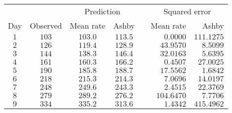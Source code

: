 \begin{tabular}{cccccrr}                                                   \toprule
    &          & \multicolumn{2}{c}{Prediction}  && \multicolumn{2}{c}{Squared error} \\
  \cmidrule{3-4}  \cmidrule{6-7}
Day & Observed & Mean rate & Ashby   && Mean rate  & Ashby      \\\midrule
$1$ & $103$    & $103.0$   & $113.5$ && $0.0000$   & $111.1275$ \\[4pt]
$2$ & $126$    & $119.4$   & $128.9$ && $43.9570$  & $8.5099$   \\[4pt]
$3$ & $144$    & $138.3$   & $146.4$ && $32.0163$  & $5.6395$   \\[4pt]
$4$ & $161$    & $160.3$   & $166.2$ && $0.4507$   & $27.0025$  \\[4pt]
$5$ & $190$    & $185.8$   & $188.7$ && $17.5562$  & $1.6842$   \\[4pt]
$6$ & $218$    & $215.3$   & $214.3$ && $7.0696$   & $14.0197$  \\[4pt]
$7$ & $248$    & $249.6$   & $243.3$ && $2.4515$   & $22.3769$  \\[4pt]
$8$ & $279$    & $289.2$   & $276.2$ && $104.6470$ & $7.7706$   \\[4pt]
$9$ & $334$    & $335.2$   & $313.6$ && $1.4342$   & $415.4962$ \\\bottomrule
\end{tabular}
